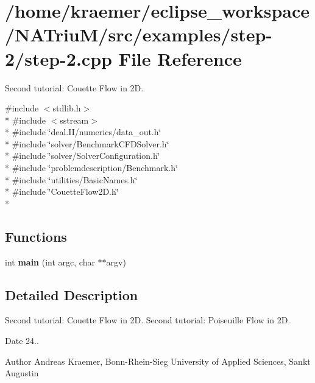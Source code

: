 \hypertarget{step-2_8cpp}{\section{/home/kraemer/eclipse\-\_\-workspace/\-N\-A\-Triu\-M/src/examples/step-\/2/step-\/2.cpp File Reference}
\label{step-2_8cpp}
}


Second tutorial\-: Couette Flow in 2\-D.  


{\ttfamily \#include $<$stdlib.\-h$>$}\\*
{\ttfamily \#include $<$sstream$>$}\\*
{\ttfamily \#include \char`\"{}deal.\-I\-I/numerics/data\-\_\-out.\-h\char`\"{}}\\*
{\ttfamily \#include \char`\"{}solver/\-Benchmark\-C\-F\-D\-Solver.\-h\char`\"{}}\\*
{\ttfamily \#include \char`\"{}solver/\-Solver\-Configuration.\-h\char`\"{}}\\*
{\ttfamily \#include \char`\"{}problemdescription/\-Benchmark.\-h\char`\"{}}\\*
{\ttfamily \#include \char`\"{}utilities/\-Basic\-Names.\-h\char`\"{}}\\*
{\ttfamily \#include \char`\"{}Couette\-Flow2\-D.\-h\char`\"{}}\\*
\subsection*{Functions}
\begin{DoxyCompactItemize}
\item 
\hypertarget{step-2_8cpp_a3c04138a5bfe5d72780bb7e82a18e627}{int {\bfseries main} (int argc, char $\ast$$\ast$argv)}\label{step-2_8cpp_a3c04138a5bfe5d72780bb7e82a18e627}

\end{DoxyCompactItemize}


\subsection{Detailed Description}
Second tutorial\-: Couette Flow in 2\-D. Second tutorial\-: Poiseuille Flow in 2\-D.

\begin{DoxyDate}{Date}
24.. 
\end{DoxyDate}
\begin{DoxyAuthor}{Author}
Andreas Kraemer, Bonn-\/\-Rhein-\/\-Sieg University of Applied Sciences, Sankt Augustin 
\end{DoxyAuthor}
